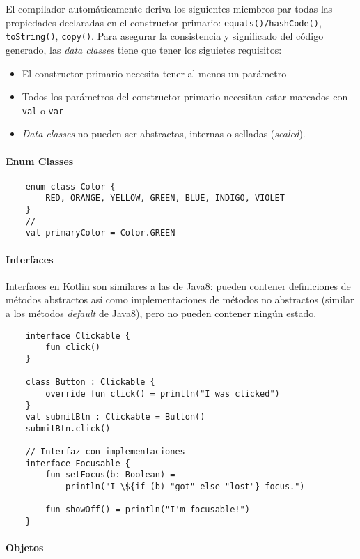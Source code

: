 El compilador automáticamente deriva los siguientes miembros par todas las propiedades declaradas en el constructor primario: \texttt{equals()/hashCode()}, \texttt{toString()}, \texttt{copy()}. Para asegurar la consistencia y significado del código generado, las \emph{data classes} tiene que tener los siguietes requisitos:
\begin{itemize}
    \item El constructor primario necesita tener al menos un parámetro
    \item Todos los parámetros del constructor primario necesitan estar marcados con \texttt{val} o \texttt{var}
    \item \emph{Data classes} no pueden ser abstractas, internas o selladas (\emph{sealed}).
\end{itemize}

\paragraph{Enum Classes}
\begin{verbatim}
    enum class Color {
        RED, ORANGE, YELLOW, GREEN, BLUE, INDIGO, VIOLET
    }
    //
    val primaryColor = Color.GREEN
\end{verbatim}

\paragraph{Interfaces}
Interfaces en Kotlin son similares a las de Java8: pueden contener definiciones de métodos abstractos así como implementaciones de métodos no abstractos (similar a los métodos \emph{default} de Java8), pero no pueden contener ningún estado.
\begin{verbatim}
    interface Clickable {
        fun click()
    }
    
    class Button : Clickable {
        override fun click() = println("I was clicked")
    }
    val submitBtn : Clickable = Button()
    submitBtn.click() 
    
    // Interfaz con implementaciones
    interface Focusable {
        fun setFocus(b: Boolean) = 
            println("I \${if (b) "got" else "lost"} focus.")
            
        fun showOff() = println("I'm focusable!")            
    }
\end{verbatim}


\paragraph{Objetos}



